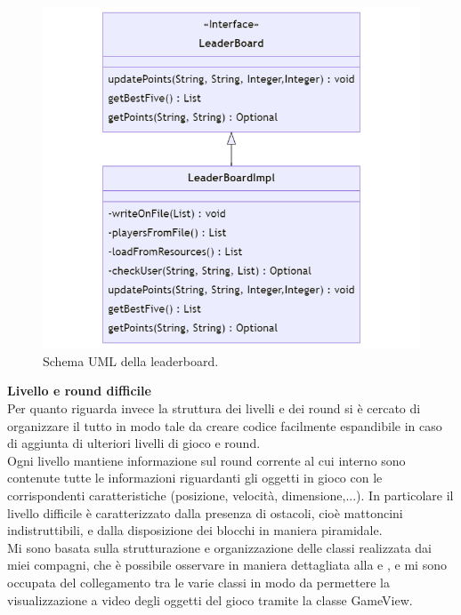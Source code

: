 \documentclass[a4paper,12pt]{report}
\begin{document}
\begin{figure}[H]
    \centering{}
    \includegraphics[scale=0.4]{images/leaderboard.png}
    \caption{Schema UML della leaderboard.}
    \label{images:leaderboard}
\end{figure}

\textbf{Livello e round difficile}\\
Per quanto riguarda invece la struttura dei livelli e dei round si è cercato di organizzare il tutto in modo tale da creare codice facilmente espandibile in caso di aggiunta di ulteriori livelli di gioco e round.
\\Ogni livello mantiene informazione sul round corrente al cui interno sono contenute tutte le informazioni riguardanti gli oggetti in gioco con le corrispondenti caratteristiche (posizione, velocità, dimensione,...).
In particolare il livello difficile è caratterizzato dalla presenza di ostacoli, cioè mattoncini indistruttibili, e dalla disposizione dei blocchi in maniera piramidale.
\\Mi sono basata sulla strutturazione e organizzazione delle classi realizzata dai miei compagni, che è possibile osservare in maniera dettagliata alla  e , e mi sono occupata del collegamento tra le varie classi in modo da permettere la visualizzazione a video degli oggetti del gioco tramite la classe GameView.\\\\
\end{document}
